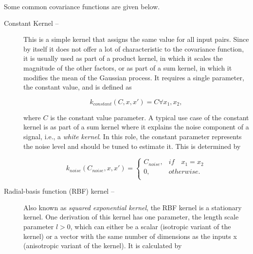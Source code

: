 Some common covariance functions are given below.


\begin{description}
	
	\item[Constant Kernel -- ]
	This is a simple kernel that assigns the same value for all input pairs.
	Since by itself it does not offer a lot of characteristic to the covariance function, it is usually used as part of a product kernel, in which it scales the magnitude of the other factors, or as part of a sum kernel, in which it modifies the mean of the Gaussian process.
	It requires a single parameter, the constant value, and is defined as 
	
	\begin{equation}
		\label{eq:constant_kernel}
		k_{constant}(C, x, x') = C\forall x_1, x_2,
	\end{equation}
	
	where $C$ is the constant value parameter.
	A typical use case of the constant kernel is as part of a sum kernel where it explains the noise component of a signal, i.e., a \textit{white kernel}.
	In this role, the constant parameter represents the noise level and should be tuned to estimate it.
	This is determined by
	
	\begin{equation}
		\label{eq:noise_kernel}
		k_{noise}(C_{noise}, x, x') =
		\begin{cases}
		C_{noise}, & if\quad x_1 = x_2\\
		0, & otherwise.\\
		\end{cases}
	\end{equation}
	
	\item[Radial-basis function (RBF) kernel --]
	Also known as \textit{squared exponential kernel}, the RBF kernel is a stationary kernel.
	One derivation of this kernel has one parameter, the length scale parameter $l > 0$, which can either be a scalar (isotropic variant of the kernel) or a vector with the same number of dimensions as the inputs x (anisotropic variant of the kernel).
	It is calculated by
	

\end{description}
